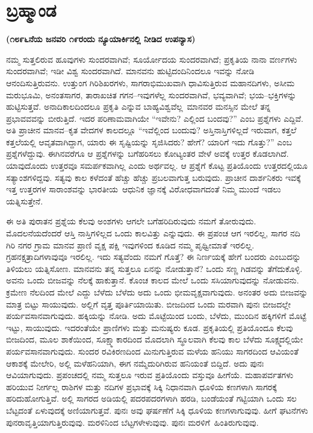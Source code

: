 
\chapter{ಬ್ರಹ್ಮಾಂಡ}%

\centerline{\textbf{(೧೮೯೬ನೆಯ ಜನವರಿ ೧೯ರಂದು ನ್ಯೂಯಾರ್ಕಿನಲ್ಲಿ ನೀಡಿದ ಉಪನ್ಯಾಸ)}}

ನಮ್ಮ ಸುತ್ತಲಿರುವ ಹೂವುಗಳು ಸುಂದರವಾಗಿವೆ; ಸೂರ್ಯೋದಯ ಸುಂದರವಾಗಿದೆ; ಪ್ರಕೃತಿಯ ನಾನಾ ವರ್ಣಗಳು ಸುಂದರವಾಗಿವೆ; ಇಡೀ ವಿಶ್ವ ಸುಂದರವಾಗಿದೆ. ಮಾನವನು ಹುಟ್ಟಿದಂದಿನಿಂದಲೂ ಇವನ್ನು ನೋಡಿ ಆನಂದಿಸುತ್ತಿರುವನು. ಉತ್ತುಂಗ ಗಿರಿಶಿಖರಗಳು, ಸಾಗರಾಭಿಮುಖವಾಗಿ ಧಾವಿಸುತ್ತಿರುವ ಮಹಾನದಿಗಳು, ಅಸೀಮ ಮರುಭೂಮಿ, ಅನಂತಸಾಗರ, ತಾರಾಖಚಿತ ಗಗನ–ಇವುಗಳೆಲ್ಲ ಸುಂದರವಾಗಿವೆ, ಭವ್ಯವಾಗಿವೆ; ಭಯ–ಭಕ್ತಿಗಳನ್ನು ಹುಟ್ಟಿಸುತ್ತವೆ. ಅನಾದಿಕಾಲದಿಂದಲೂ ಪ್ರಕೃತಿ ಎನ್ನುವ ಬಾಹ್ಯವಿಶ್ವವೆಲ್ಲ\break\ ಮಾನವರ ಮನಸ್ಸಿನ ಮೇಲೆ ತನ್ನ ಪ್ರಭಾವವವನ್ನು ಬೀರುತ್ತಿದೆ. ಇದರ ಪರಿಣಾಮವಾಗಿಯೇ “ಇವೇನು? ಎಲ್ಲಿಂದ ಬಂದವು?” ಎಂಬ ಪ್ರಶ್ನೆಗಳು ಎದ್ದಿವೆ. ಅತಿ ಪ್ರಾಚೀನ ಮಾನವ–ಕೃತ ವೇದಗಳ ಕಾಲದಲ್ಲೂ “ಇವೆಲ್ಲಿಂದ ಬಂದುವು? ಅಸ್ತಿನಾಸ್ತಿಗಳಿಲ್ಲದೆ ಇರುವಾಗ, ಕತ್ತಲೆ ಕತ್ತಲೆಯಲ್ಲಿ ಆವೃತವಾಗಿದ್ದಾಗ, ಯಾರು ಈ ಸೃಷ್ಟಿಯನ್ನು ಸೃಜಿಸಿದರು? ಹೇಗೆ? ಯಾರಿಗೆ ಇದು ಗೊತ್ತು?” ಎಂಬ ಪ್ರಶ್ನೆಗಳೆದ್ದುವು. ಈಗಿನವರೆಗೂ ಆ ಪ್ರಶ್ನೆಗಳನ್ನು ಬಗೆಹರಿಸಲು ಕೋಟ್ಯಂತರ ವೇಳೆ ಅವಕ್ಕೆ ಉತ್ತರ ಕೊಡಲಾಗಿದೆ. ಯಾವುದೊಂದು ಉತ್ತರವೂ ಸಮರ್ಪಕವಾಗಿಲ್ಲ ಎಂದು ಅರ್ಥವಲ್ಲ. ಆ ಪ್ರಶ್ನೆಗೆ ಕೊಟ್ಟ ಪ್ರತಿಯೊಂದು ಉತ್ತರದಲ್ಲಿಯೂ ಸತ್ಯಾಂಶಗಳಿದ್ದವು. ಸತ್ಯವು ಕಾಲ ಕಳೆದಂತೆ ಹೆಚ್ಚು ಹೆಚ್ಚು ಪ್ರಬಲವಾಗುತ್ತ ಬರುವುದು. ಪ್ರಾಚೀನ ದಾರ್ಶನಿಕರು ಇವಕ್ಕೆ ಇತ್ತ ಉತ್ತರಗಳ ಸಾರಾಂಶವನ್ನು ಭಾರತೀಯ\break\ ಆಧುನಿಕ ಜ್ಞಾನಕ್ಕೆ ವಿರೋಧವಾಗದಂತೆ ನಿಮ್ಮ ಮುಂದೆ ಇಡಲು ಯತ್ನಿಸುತ್ತೇನೆ.

ಈ ಅತಿ ಪುರಾತನ ಪ್ರಶ್ನೆಯ ಕೆಲವು ಅಂಶಗಳು ಆಗಲೇ ಬಗೆಹರಿದಿರುವುದು ನಮಗೆ ತೋರುವುದು. ಮೊದಲನೆಯದೆಂದರೆ ಆಸ್ತಿ ನಾಸ್ತಿಗಳಿಲ್ಲದ ಒಂದು ಕಾಲವಿತ್ತು ಎನ್ನುವುದು. ಈ ಪ್ರಪಂಚ ಆಗ ಇರಲಿಲ್ಲ, ಸಾಗರ ನದಿ ಗಿರಿ ನಗರ ಗ್ರಾಮ ಮಾನವ ಪ್ರಾಣಿ ವೃಕ್ಷ ಪಕ್ಷಿ ಇವುಗಳಿಂದ ಕೂಡಿದ ನಮ್ಮ ಪೃಥ್ವೀಮಾತೆ ಇರಲಿಲ್ಲ. ಗ್ರಹನಕ್ಷತ್ರಾದಿಗಳಾವುವೂ ಇರಲಿಲ್ಲ. ಇದು ಸತ್ಯವೆಂದು ನಮಗೆ ಗೊತ್ತೆ? ಈ ನಿರ್ಣಯಕ್ಕೆ ಹೇಗೆ ಬಂದರು ಎಂಬುದನ್ನು ತಿಳಿಯಲು ಯತ್ನಿಸೋಣ. ಮಾನವನು ತನ್ನ ಸುತ್ತಲೂ ಏನನ್ನು ನೋಡುತ್ತಾನೆ? ಒಂದು ಸಣ್ಣ ಗಿಡವನ್ನು ತೆಗೆದುಕೊಳ್ಳಿ. ಅವನು ಒಂದು ಬೀಜವನ್ನು ನೆಲಕ್ಕೆ ಹಾಕುತ್ತಾನೆ. ಕೊಂಚ ಕಾಲದ ಮೇಲೆ ಒಂದು ಸಸಿಯಾಗುವುದನ್ನು ನೋಡುವನು. ಕ್ರಮೇಣ ನೆಲದಿಂದ ಮೇಲೆ ಎದ್ದು ಬೆಳೆದು ಬೆಳೆದು ಅದು ಒಂದು ಭೀಮವೃಕ್ಷವಾಗುವುದು. ಅನಂತರ ಅದು ಬೀಜವನ್ನು ಮಾತ್ರ ಬಿಟ್ಟು ಸಾಯುವುದು. ಅಲ್ಲಿಗೆ ವೃತ್ತ ಪೂರ್ತಿಯಾಯಿತು. ಬೀಜದಿಂದ ಒಂದು ಮರವಾಗಿ ಪುನಃ ಬೀಜದಲ್ಲೇ ಪರ್ಯವಸಾನವಾಗುವುದು. ಹಕ್ಕಿಯನ್ನು ನೋಡಿ. ಅದು ಮೊಟ್ಟೆಯಿಂದ ಬಂದು, ಬೆಳೆದು, ಮುಂದಿನ ಹಕ್ಕಿಗಳಿಗೆ ಮೊಟ್ಟೆ ಇಟ್ಟು, ಸಾಯುವುದು. ಇದರಂತೆಯೇ ಪ್ರಾಣಿಗಳು ಮತ್ತು ಮನುಷ್ಯರು ಕೂಡ. ಪ್ರಕೃತಿಯಲ್ಲಿ ಪ್ರತಿಯೊಂದೂ ಕೆಲವು ಬೀಜದಿಂದ, ಮೂಲ ಶಾಕೆಯಿಂದ, ಸೂಕ್ಷ್ಮಾಕಾರದಿಂದ ಮೊದಲಾಗಿ ಸ್ಥೂಲವಾಗಿ ಕೆಲವು ಕಾಲ ಬೆಳೆದು ಸೂಕ್ಷ್ಮದಲ್ಲಿಯೇ ಪರ್ಯವಸಾನವಾಗುವುದು. ಸುಂದರ ರವಿಕಿರಣದಿಂದ ಮಿನುಗುತ್ತಿರುವ ಮಳೆಯ ಹನಿಯು ಸಾಗರದಿಂದ ಆವಿಯಂತೆ ಆಕಾಶಕ್ಕೆ ಮೇಲೇರಿ, ಅಲ್ಲಿ ಮಳೆಹನಿಯಾಗಿ, ಈಗ ನಮ್ಮೆದುರಿಗಿರುವ ಹನಿಯಂತೆ ಬಿದ್ದಿದೆ. ಅದು ಪುನಃ ಆವಿಯಾಗುವುದು. ಪ್ರಪಂಚದಲ್ಲಿ ನಮ್ಮ ಸುತ್ತಲೂ ಇರುವ ಪ್ರತಿಯೊಂದು ವಸ್ತುವೂ ಹೀಗೆಯೆ. ಮಹಾಪರ್ವತಗಳು ಹರಿಯುವ ನೀರ್ಗಲ್ಲ ರಾಶಿಗಳ ಮತ್ತು ನದಿಗಳ ಪ್ರಭಾವಕ್ಕೆ ಸಿಕ್ಕಿ ನಿಧಾನವಾಗಿ ಧೂಳಿಯ ಕಣಗಳಾಗಿ ಸಾಗರಕ್ಕೆ ಹರಿದುಹೋಗುತ್ತಿವೆ. ಅಲ್ಲಿ ಸಾಗರದ ಅಡಿಯಲ್ಲಿ ಪದರಪದರಗಳಾಗಿ ಹರಡಿ, ಬಂಡೆಯಂತೆ ಗಟ್ಟಿಯಾಗಿ ಒಂದು ಸಲ ಬೆಟ್ಟದಂತೆ ಏಳುವುದಕ್ಕೆ ಅಣಿಯಾಗುತ್ತವೆ. ಪುನಃ ಅವು ಘರ್ಷಣೆಗೆ ಸಿಕ್ಕಿ ಧೂಳಿಯ ಕಣಗಳಾಗುವುವು. ಹೀಗೆ ಘಟನೆಗಳು ಪುನರಾವೃತ್ತಿಯಾಗುತ್ತಿರುವುವು. ಮರಳಿನಿಂದ ಬೆಟ್ಟಗಳೇಳುವುವು. ಪುನಃ ಮರಳಿಗೆ\break\ ಹಿಂತಿರುಗುವುವು.

